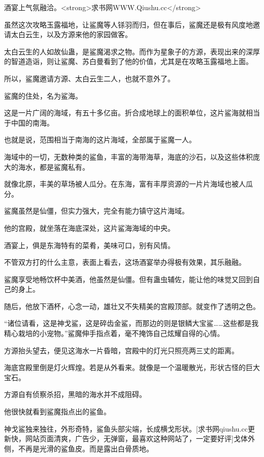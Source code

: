 
\begin{this_body}

酒宴上气氛融洽。<strong>求书网WWW.Qiushu.cc</strong>

虽然这次攻略玉露福地，让鲨魔等人铩羽而归，但在事后，鲨魔还是极有风度地邀请太白云生，以及方源来他的家园做客。

太白云生的人如故仙蛊，是鲨魔渴求之物。而作为星象子的方源，表现出来的深厚的智道造诣，则让鲨魔、苏白曼看到了他的价值，尤其是在攻略玉露福地上面。

所以，鲨魔邀请方源、太白云生二人，也就不意外了。

鲨魔的住处，名为鲨海。

这是一片广阔的海域，有五十多亿亩。折合成地球上的面积单位，这片鲨海就相当于中国的南海。

也就是说，范围相当于南海的这片海域，全部属于鲨魔一人。

海域中的一切，无数种类的鲨鱼，丰富的海带海草，海底的沙石，以及这些体积庞大的海水，都是鲨魔私有。

就像北原，丰美的草场被人瓜分。在东海，富有丰厚资源的一片片海域也被人瓜分。

鲨魔虽然是仙僵，但实力强大，完全有能力镇守这片海域。

他的宫殿，就坐落在海底深处，这片鲨海海域的中央。

酒宴上，俱是东海特有的菜肴，美味可口，别有风情。

不管双方打的什么主意，表面上看去，这场酒宴举办得极有效果，其乐融融。

鲨魔享受地畅饮杯中美酒，他虽然是仙僵。但有蛊虫辅佐，能让他的味觉又回到自己的身上。

随后，他放下酒杯，心念一动，雄壮又不失精美的宫殿顶部。就变作了透明之色。

“诸位请看，这是神戈鲨，这是碎齿金鲨，而那边的则是银鳞大宝鲨……这些都是我精心栽培的小宠物。”鲨魔伸手指点着，毫不掩饰自己炫耀自得的心情。

方源抬头望去，便见这海水一片昏暗，宫殿中的灯光只照亮两三丈的距离。

海底宫殿里倒是灯火辉煌。若是从外看来。就像是一个温暖散光，形状古怪的巨大宝石。

方源自有侦察杀招，黑暗的海水并不成阻碍。

他很快就看到鲨魔指点出的鲨鱼。

神戈鲨独来独往，外形奇特，鲨鱼头部尖端，长成横戈形状。[求书网qiushu.cc更新快，网站页面清爽，广告少，无弹窗，最喜欢这种网站了，一定要好评]戈体外侧，不再是光滑的鲨鱼皮。而是露出白骨质地。


\end{this_body}
